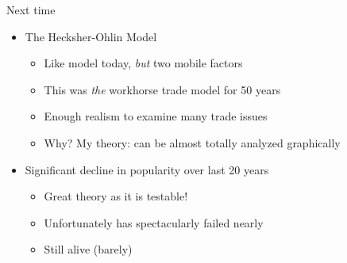 \documentclass[ignorenonframetext,]{beamer}
\begin{document}
\begin{frame}{Next time}

    \begin{itemize}
        \item The Hecksher-Ohlin Model
        \begin{itemize}
            \item Like model today, \emph{but} two mobile factors
            \item This was \emph{the} workhorse trade model for 50 years 
            \item Enough realism to examine many trade issues
            \item Why? My theory: can be almost totally analyzed graphically
        \end{itemize}
        \item Significant decline in popularity over last 20 years
        \begin{itemize}
            \item Great theory as it is testable!
            \item Unfortunately has spectacularly failed nearly 
            \item Still alive (barely)
        \end{itemize}
    \end{itemize}

\end{frame}
\end{document}
